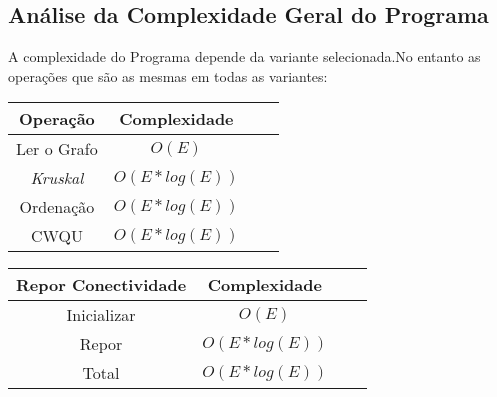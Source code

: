 \documentclass[14pt]{article}
\begin{document}
    \subsection[Análise da Complexidade Geral]{Análise da Complexidade Geral do Programa} 
    A complexidade do Programa depende da variante selecionada.No entanto as operações que são as mesmas em todas as variantes:
    \FloatBarrier
    \begin{table}[H]
        \centering
        \begin{tabular}{|| c || c || c || c ||}
            \hline
            Operação & Complexidade\\ [0.5ex]
            \hline\hline
            Ler o Grafo & \(O(E)\) \\
            \emph{Kruskal} &\(O(E*log(E))\) \\
            Ordenação & \(O(E*log(E))\) \\
            CWQU & \(O(E*log(E))\)\\
            \hline\hline
        \end{tabular}
        \quad
        \begin{tabular}{|| c || c || c || c ||}
            \hline
            Repor Conectividade & Complexidade\\ [0.5ex]
            \hline\hline
            Inicializar & \(O(E)\)\\
            Repor & \(O(E*log(E))\) \\
            Total & \(O(E*log(E))\)\\
            \hline\hline
        \end{tabular}\\
    \end{table}
\end{document}
